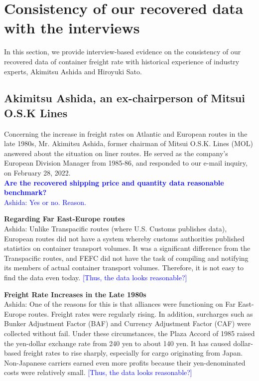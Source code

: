 \section{Consistency of our recovered data with the interviews}\label{sec:interview}

In this section, we provide interview-based evidence on the consistency of our recovered data of container freight rate with historical experience of industry experts, Akimitsu Ashida and Hiroyuki Sato.

\subsection{Akimitsu Ashida, an ex-chairperson of Mitsui O.S.K Lines}

Concerning the increase in freight rates on Atlantic and European routes in the late 1980s, Mr. Akimitsu Ashida, former chairman of Mitsui O.S.K. Lines (MOL) answered about the situation on liner routes. He served as the company's European Division Manager from 1985-86, and responded to our e-mail inquiry, on February 28, 2022.\\

\textcolor{blue}{\textbf{Are the recovered shipping price and quantity data reasonable benchmark?} \\
Ashida: Yes or no. Reason.
}

\textbf{Regarding Far East-Europe routes} \\
Ashida: Unlike Transpacific routes (where U.S. Customs publishes data), European routes did not have a system whereby customs authorities published statistics on container transport volumes. It was a significant difference from the Transpacific routes, and FEFC did not have the task of compiling and notifying its members of actual container transport volumes. Therefore, it is not easy to find the data even today. \textcolor{blue}{[Thus, the data looks reasonable?]}

\textbf{Freight Rate Increases in the Late 1980s} \\
Ashida: One of the reasons for this is that alliances were functioning on Far East-Europe routes. Freight rates were regularly rising. In addition, surcharges such as Bunker Adjustment Factor (BAF) and Currency Adjustment Factor (CAF) were collected without fail. Under these circumstances, the Plaza Accord of 1985 raised the yen-dollar exchange rate from 240 yen to about 140 yen. It has caused dollar-based freight rates to rise sharply, especially for cargo originating from Japan. Non-Japanese carriers earned even more profits because their yen-denominated costs were relatively small.  \textcolor{blue}{[Thus, the data looks reasonable?]}

